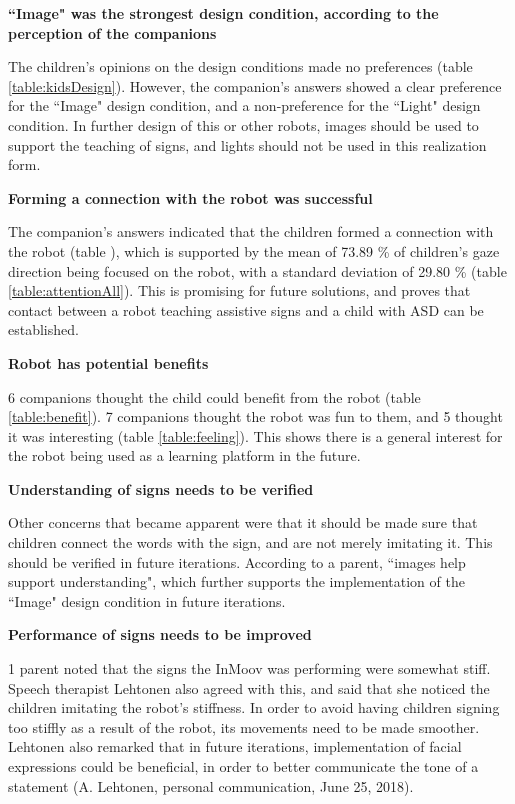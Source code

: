\vspace{3mm}
\noindent\textbf{``Image" was the strongest design condition, according to the perception of the companions}

The children's opinions on the design conditions made no preferences (table \ref{table:kidsDesign}). However, the companion's answers showed a clear preference for the ``Image" design condition, and a non-preference for the ``Light" design condition. In further design of this or other robots, images should be used to support the teaching of signs, and lights should not be used in this realization form.

\newpage
\vspace{3mm}
\noindent\textbf{Forming a connection with the robot was successful}

The companion's answers indicated that the children formed a connection with the robot (table \label{table:contact}), which is supported by the mean of 73.89 \% of children's gaze direction being focused on the robot, with a standard deviation of 29.80 \% (table \ref{table:attentionAll}). This is promising for future solutions, and proves that contact between a robot teaching assistive signs and a child with ASD can be established.

\vspace{3mm}
\noindent\textbf{Robot has potential benefits}

6 companions thought the child could benefit from the robot (table \ref{table:benefit}). 7 companions thought the robot was fun to them, and 5 thought it was interesting (table \ref{table:feeling}). This shows there is a general interest for the robot being used as a learning platform in the future.

\vspace{3mm}
\noindent\textbf{Understanding of signs needs to be verified}

Other concerns that became apparent were that it should be made sure that children connect the words with the sign, and are not merely imitating it. This should be verified in future iterations. According to a parent, ``images help support understanding", which further supports the implementation of the ``Image" design condition in future iterations.

\vspace{3mm}
\noindent\textbf{Performance of signs needs to be improved}

1 parent noted that the signs the InMoov was performing were somewhat stiff. Speech therapist Lehtonen also agreed with this, and said that she noticed the children imitating the robot's stiffness. In order to avoid having children signing too stiffly as a result of the robot, its movements need to be made smoother. Lehtonen also remarked that in future iterations, implementation of facial expressions could be beneficial, in order to better communicate the tone of a statement (A. Lehtonen, personal communication, June 25, 2018).

